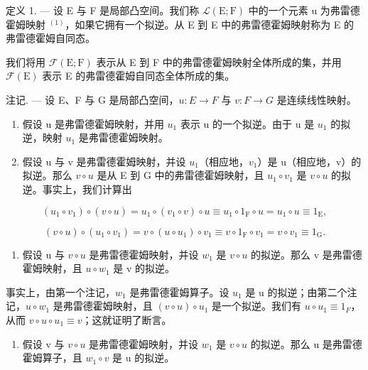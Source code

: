 定义 1. --- 设 E 与 F 是局部凸空间。我们称 \(\mathcal{L}(\mathrm{E};\mathrm{F})\) 中的一个元素 u 为弗雷德霍姆映射 \(^{(1)}\)，如果它拥有一个拟逆。从 E 到 E 中的弗雷德霍姆映射称为 E 的弗雷德霍姆自同态。

我们将用 \(\mathcal{F}(\mathrm{E};\mathrm{F})\) 表示从 E 到 F 中的弗雷德霍姆映射全体所成的集，并用 \(\mathcal{F}(\mathrm{E})\) 表示 E 的弗雷德霍姆自同态全体所成的集。

注记. --- 设 E、F 与 G 是局部凸空间，\(u: E \to F\) 与 \(v: F \to G\) 是连续线性映射。

\begin{enumerate}
\def\labelenumi{\arabic{enumi})}
\item
  假设 u 是弗雷德霍姆映射，并用 \(u_{1}\) 表示 u 的一个拟逆。由于 u 是 \(u_{1}\) 的拟逆，映射 \(u_{1}\) 是弗雷德霍姆映射。
\item
  假设 u 与 v 是弗雷德霍姆映射，并设 \(u_{1}\)（相应地，\(v_{1}\)）是 u（相应地，v）的拟逆。那么 \(v \circ u\) 是从 E 到 G 中的弗雷德霍姆映射，且 \(u_{1} \circ v_{1}\) 是 \(v \circ u\) 的拟逆。事实上，我们计算出
\end{enumerate}

\[
\left(u _ {1} \circ v _ {1}\right) \circ (v \circ u) = u _ {1} \circ \left(v _ {1} \circ v\right) \circ u \equiv u _ {1} \circ 1 _ {\mathrm{F}} \circ u = u _ {1} \circ u \equiv 1 _ {\mathrm{E}},
\]

\[
(v \circ u) \circ (u _ {1} \circ v _ {1}) = v \circ (u \circ u _ {1}) \circ v _ {1} \equiv v \circ 1 _ {\mathrm{F}} \circ v _ {1} = v \circ v _ {1} \equiv 1 _ {\mathrm{G}}.
\]

\begin{enumerate}
\def\labelenumi{\arabic{enumi})}
\setcounter{enumi}{2}
\tightlist
\item
  假设 u 与 \(v \circ u\) 是弗雷德霍姆映射，并设 \(w_{1}\) 是 \(v \circ u\) 的拟逆。那么 v 是弗雷德霍姆映射，且 \(u \circ w_{1}\) 是 v 的拟逆。
\end{enumerate}

事实上，由第一个注记，\(w_{1}\) 是弗雷德霍姆算子。设 \(u_{1}\) 是 u 的拟逆；由第二个注记，\(u \circ w_{1}\) 是弗雷德霍姆映射，且 \((v \circ u) \circ u_{1}\) 是一个拟逆。我们有 \(u \circ u_{1} \equiv 1_{F}\)，从而 \(v \circ u \circ u_{1} \equiv v\)；这就证明了断言。

\begin{enumerate}
\def\labelenumi{\arabic{enumi})}
\setcounter{enumi}{3}
\tightlist
\item
  假设 v 与 \(v \circ u\) 是弗雷德霍姆映射，并设 \(w_{1}\) 是 \(v \circ u\) 的拟逆。那么 u 是弗雷德霍姆算子，且 \(w_{1} \circ v\) 是 u 的拟逆。
\end{enumerate}

